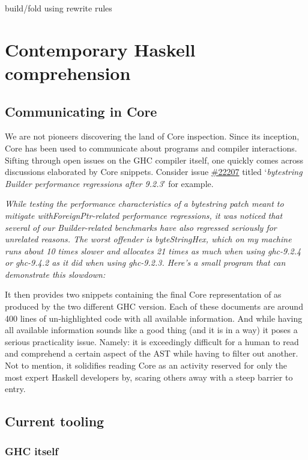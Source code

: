build/fold using rewrite rules

\section{Contemporary Haskell comprehension}

\subsection{Communicating in Core}
\label{section:communicating_core}

We are not pioneers discovering the land of Core inspection. Since its inception, Core has
been used to communicate about programs and compiler interactions. Sifting through open issues on the
GHC compiler itself, one quickly comes across discussions elaborated by Core snippets. Consider issue
\href{https://gitlab.haskell.org/ghc/ghc/-/issues/22207}{\#22207} titled `\textit{bytestring Builder performance regressions after 9.2.3}' for example.
\hfill \break

\textit{While testing the performance characteristics of a bytestring patch meant to mitigate withForeignPtr-related performance regressions,
it was noticed that several of our Builder-related benchmarks have also regressed seriously for unrelated reasons.
The worst offender is byteStringHex, which on my machine runs about 10 times slower and allocates 21 times as much when using ghc-9.2.4 or ghc-9.4.2
as it did when using ghc-9.2.3. Here's a small program that can demonstrate this slowdown:}
\hfill \break

It then provides two snippets containing the final Core representation of  as produced by the two different GHC version.
Each of these documents are around 400 lines of un-highlighted code with all available information. And while having all available information
sounds like a good thing (and it is in a way) it poses a serious practicality issue.
Namely: it is exceedingly difficult for a human to read and comprehend a certain aspect of the AST while having to filter out another.
Not to mention, it solidifies reading Core as an activity reserved for only the most expert Haskell developers by, scaring others away with
a steep barrier to entry.

\subsection{Current tooling}

\subsubsection{GHC itself}


